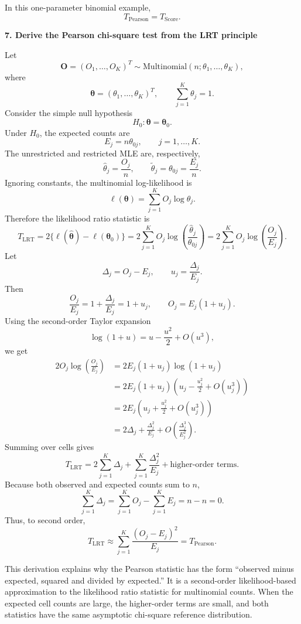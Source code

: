\documentclass[12pt]{article}
\begin{document}
In this one-parameter binomial example,
\[
T_{\mathrm{Pearson}}=T_{\mathrm{Score}}.
\]
\bigskip

{\bf 7. Derive the Pearson chi-square test from the LRT principle}

Let
\[
\mathbf O=(O_1,\ldots,O_K)^T\sim
\mathrm{Multinomial}(n;\theta_1,\ldots,\theta_K),
\]
where
\[
\boldsymbol\theta=(\theta_1,\ldots,\theta_K)^T,
\qquad
\sum_{j=1}^K \theta_j=1.
\]
Consider the simple null hypothesis
\[
H_0:\boldsymbol\theta=\boldsymbol\theta_0.
\]
Under $H_0$, the expected counts are
\[
E_j=n\theta_{0j}, \qquad j=1,\ldots,K.
\]
The unrestricted and restricted MLE are, respectively, 
\[
\hat\theta_j=\frac{O_j}{n},
\qquad
\tilde\theta_j=\theta_{0j}=\frac{E_j}{n}.
\]
Ignoring constants, the multinomial log-likelihood is
\[
\ell(\boldsymbol\theta)=\sum_{j=1}^K O_j\log \theta_j.
\]
Therefore the likelihood ratio statistic is
\[
T_{\mathrm{LRT}}
=2\{\ell(\hat{\boldsymbol\theta})-\ell(\boldsymbol\theta_0)\}
=2\sum_{j=1}^K O_j\log\left(\frac{\hat\theta_j}{\theta_{0j}}\right)=2\sum_{j=1}^K O_j\log\left(\frac{O_j}{E_j}\right).
\]
Let 
\[
\Delta_j=O_j-E_j,
\qquad u_j=\frac{\Delta_j}{E_j}.
\]
Then
\[
\frac{O_j}{E_j}=1+\frac{\Delta_j}{E_j}=1+u_j,
\qquad 
{O_j}=E_j(1+u_j).
\]
Using the second-order Taylor expansion
\[
\log(1+u)=u-\frac{u^2}{2}+O(u^3),
\]
we get
\[
\begin{aligned}
2O_j \log\left(\frac{O_j}{E_j}\right)
&= 2E_j(1+u_j)\log(1+u_j) \\
&= 2E_j(1+u_j)\left(u_j-\frac{u_j^2}{2}+O(u_j^3)\right) \\
&= 2E_j\left(u_j+\frac{u_j^2}{2}+O(u_j^3)\right)\\
&= 2\Delta_j+\frac{\Delta_j^2}{E_j}+O\left(\frac{\Delta_j^3}{E_j^2}\right).
\end{aligned}
\]
Summing over cells gives
\[
T_{\mathrm{LRT}}
=2\sum_{j=1}^K \Delta_j+
\sum_{j=1}^K \frac{\Delta_j^2}{E_j}
+\text{higher-order terms}.
\]
Because both observed and expected counts sum to $n$,
\[
\sum_{j=1}^K \Delta_j
=\sum_{j=1}^K O_j-
\sum_{j=1}^K E_j
=n-n=0.
\]
Thus, to second order,
\[
T_{\mathrm{LRT}}
\approx
\sum_{j=1}^K \frac{(O_j-E_j)^2}{E_j}
=T_{\mathrm{Pearson}}.
\]

This derivation explains why the Pearson statistic has the form ``observed minus expected, squared and divided by expected.'' It is a second-order likelihood-based approximation to the likelihood ratio statistic for multinomial counts. When the expected cell counts are large, the higher-order terms are small, and both statistics have the same asymptotic chi-square reference distribution.
\smallskip
\end{document}
